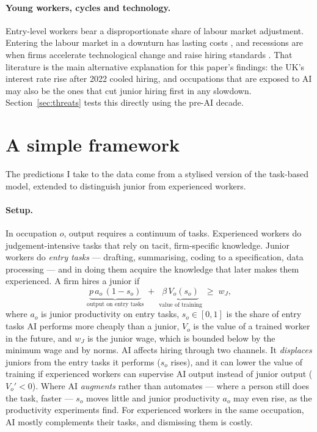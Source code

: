 \documentclass[11pt]{article}
\begin{document}
\paragraph{Young workers, cycles and technology.} Entry-level workers bear a disproportionate share of labour market adjustment. Entering the labour market in a downturn has lasting costs \citep{kahn2010,oreopoulos2012,schwandt2019}, and recessions are when firms accelerate technological change and raise hiring standards \citep{hershbein2018,modestino2020,jaimovich2020}. That literature is the main alternative explanation for this paper's findings: the UK's interest rate rise after 2022 cooled hiring, and occupations that are exposed to AI may also be the ones that cut junior hiring first in any slowdown. Section~\ref{sec:threats} tests this directly using the pre-AI decade.

\section{A simple framework}\label{sec:model}

The predictions I take to the data come from a stylised version of the task-based model, extended to distinguish junior from experienced workers.

\paragraph{Setup.} In occupation $o$, output requires a continuum of tasks. Experienced workers do judgement-intensive tasks that rely on tacit, firm-specific knowledge. Junior workers do \emph{entry tasks} --- drafting, summarising, coding to a specification, data processing --- and in doing them acquire the knowledge that later makes them experienced. A firm hires a junior if
\begin{equation}\label{eq:hire}
  \underbrace{p\,a_o\,(1-s_o)}_{\text{output on entry tasks}} \; + \; \underbrace{\beta\,V_o(s_o)}_{\text{value of training}} \;\geq\; w_J,
\end{equation}
where $a_o$ is junior productivity on entry tasks, $s_o \in [0,1]$ is the share of entry tasks AI performs more cheaply than a junior, $V_o$ is the value of a trained worker in the future, and $w_J$ is the junior wage, which is bounded below by the minimum wage and by norms. AI affects hiring through two channels. It \emph{displaces} juniors from the entry tasks it performs ($s_o$ rises), and it can lower the value of training if experienced workers can supervise AI output instead of junior output ($V_o' < 0$). Where AI \emph{augments} rather than automates --- where a person still does the task, faster --- $s_o$ moves little and junior productivity $a_o$ may even rise, as the productivity experiments find. For experienced workers in the same occupation, AI mostly complements their tasks, and dismissing them is costly.
\end{document}
